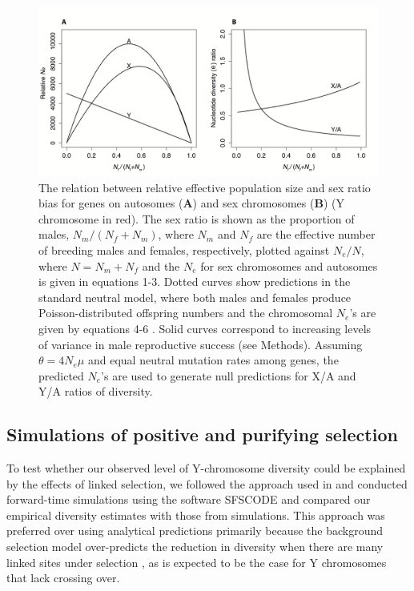 \documentclass[9pt,twocolumn,twoside]{gsajnl}
\begin{document}
\begin{figure}[htbp]
\centering
\includegraphics[width=\linewidth]{Figure1.png}
\caption{The relation between relative effective population size and sex ratio bias for genes on autosomes (\textbf{A}) and sex chromosomes (\textbf{B}) (Y chromosome in red). The sex ratio is shown as the proportion of males, $N_{m}/(N_{f}+N_{m})$, where $N_{m}$ and $N_{f}$ are the effective number of breeding males and females, respectively, plotted against $N_{e}/N$, where $N=N_{m}+N_{f}$ and the $N_{e}$ for sex chromosomes and autosomes is given in equations 1-3. Dotted curves show predictions in the standard neutral model, where both males and females produce Poisson-distributed offspring numbers and the chromosomal $N_{e}$'s are given by equations 4-6 \citep{wright1931evolution}. Solid curves correspond to increasing levels of variance in male reproductive success \citep{nomura2002effective} (see Methods). Assuming $\theta=4N_{e}\mu$ and equal neutral mutation rates among genes, the predicted $N_{e}$'s are used to generate null predictions for X/A and Y/A ratios of diversity.  
}
\label{fig:spectrum}
\end{figure}

\subsection*{Simulations of positive and purifying selection}
To test whether our observed level of Y-chromosome diversity could be explained by the effects of linked selection, we followed the approach used in \citep{Wilsonsayres2014} and conducted forward-time simulations using the software SFSCODE \citep{hernandez2008flexible} and compared our empirical diversity estimates with those from simulations. This approach was preferred over using analytical predictions primarily because the background selection model over-predicts the reduction in diversity when there are many linked sites under selection \citep{KaiserCharlesworth}, as is expected to be the case for Y chromosomes that lack crossing over. 
\end{document}
